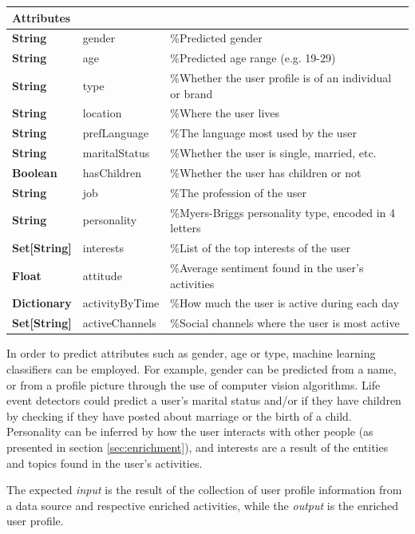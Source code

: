 \begin{center}
\begin{tabular}{lll}
\hline
Attributes & & \\
\hline
\textbf{String} & gender & \%Predicted gender \\
\textbf{String} & age & \%Predicted age range (e.g. 19-29) \\
\textbf{String} & type & \%Whether the user profile is of an individual or brand \\
\textbf{String} & location & \%Where the user lives \\
\textbf{String} & prefLanguage & \%The language most used by the user \\
\textbf{String} & maritalStatus & \%Whether the user is single, married, etc. \\
\textbf{Boolean} & hasChildren & \%Whether the user has children or not \\
\textbf{String} & job & \%The profession of the user \\
\textbf{String} & personality & \%Myers-Briggs personality type, encoded in 4 letters \\
\textbf{Set[String]} & interests & \%List of the top interests of the user \\
\textbf{Float} & attitude & \%Average sentiment found in the user's activities \\
\textbf{Dictionary} & activityByTime & \%How much the user is active during each day \\
\textbf{Set[String]} & activeChannels & \%Social channels where the user is most active \\
\hline
\end{tabular}
\end{center}

In order to predict attributes such as gender, age or type, machine learning classifiers can be employed. For example, gender can be predicted from a name, or from a profile picture through the use of computer vision algorithms. Life event detectors could predict a user's marital status and/or if they have children by checking if they have posted about marriage or the birth of a child. Personality can be inferred by how the user interacts with other people (as presented in section \ref{sec:enrichment}), and interests are a result of the entities and topics found in the user's activities.

The expected \emph{input} is the result of the collection of user profile information from a data source and respective enriched activities, while the \emph{output} is the enriched user profile.

